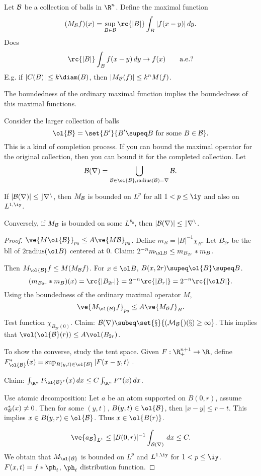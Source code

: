 Let $\cal B$ be a collection of balls in $\R^n$. Define the maximal function 
\[
(M_{\cal B}f)(x) = \sup_{B\in \cal B} \rc{|B|} \int_B |f(x-y)|\,dy.
\]
Does
\[
\rc{|B|}\int_B f(x-y)\,dy \to f(x)\qquad \text{a.e.}?
\]
E.g. if $|C(B)|\le k\diam(B)$, then $|M_{\cal B}(f)|\le k^nM(f)$.

The boundedness of the ordinary maximal function implies the boundedness of this maximal functions.

Consider the larger collection of balls 
\[
\ol{\cal B} = \set{B'}{B'\supeq B\text{ for some }B\in \cal B}.
\]
This is a  kind of completion process. If you can bound the maximal operator for the original collection, then you can bound it for the completed collection. Let
\[
\cal B(r)=\bigcup_{B\in \ol{\cal B},\text{radius}(B)=r} B.
\]

\begin{thm}
If $|\cal B(r)|\le cr^n$, then $M_{\cal B}$ is bounded on $L^p$ for all $1<p\le \iy$ and also on $L^{1,\iy}$.

Conversely, if $M_{\cal B}$ is bounded on some $L^{p_0}$, then $|\cal B(r)|\le cr^n$.
\end{thm}

\begin{proof}
$\ve{M\ol{\cal B}}_{p_0}\le A\ve{M\cal B}_{p_0}$.
Define $m_B=|B|^{-1} \chi_B$. Let $B_{2r}$ be the bll of $2\text{radius}(\ol B)$ centered at 0. Claim: $2^{-n}m_{\ol B}\le m_{B_{2r}}*m_B$.

Then $M_{\ol{\cal B}}f\le M(M_{\cal B}f)$.
For $x\in \ol B$, $B(x,2r)\supeq \ol{B}\supeq B$.
\[
(m_{B_{2r}}* m_B) (x)=\rc{|B_{2r}|}=2^{-n} \rc{|B_r|} = 2^{-n}\rc{|\ol B|}.
\]
Using the boundedness of the ordinary maximal operator $M$,
\[
\ve{M_{\ol{\cal B}}f}_{p_0}\le A\ve{M_{\cal B}f}_B.
\]
Test function $\chi_{B_{2r}(0)}$. Claim: $\cal B(r)\subeq \set{x}{(M_{\cal B}f)(x)\ge 1}$. %
This implies that $\vol(\ol{\cal B}(r))\le A\vol(B_{2r})$.

To show the converse, study the tent space. %
Given $F:\R_+^{n+1}\to \R$, define $F_{\ol{\cal B}}^*(x)=\sup_{B(y,t)\in \ol{\cal B}}|F(x-y,t)|$.

Claim: $\int_{\R^n}F_{\ol{\cal B}^*}(x)\,dx\le C\int_{\R^n} F^*(x) \,dx$.

Use atomic decomposition: Let $a$ be an atom supported on $B(0,r)$, assume $a_{\cal B}^*(x)\ne 0$. Then for some $(y,t)$, $B(y,t)\in \ol{\cal B}$, then $|x-y|\le r-t$. This implies $x\in B(y,r)\in \ol{\cal B}$. Thus $x\in \ol{B(r)}$.

\[
\ve{a_{\cal B}}_{L^1} \le |B(0,r)|^{-1}\int_{\cal B(r)}\,dx\le C.
\]
We obtain that $M_{\ol{\cal B}}$ is bounded on $L^p$ and $L^{1,\iy}$ for $1< p\le \iy$. 
$F(x,t)=f*\ph_t$, $\ph_t$ distribution function.
\end{proof}

